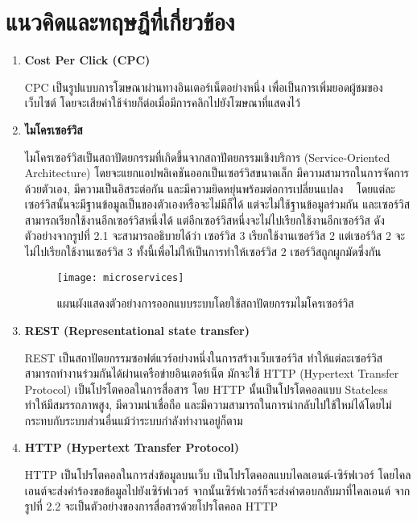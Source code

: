 \section{แนวคิดและทฤษฎีที่เกี่ยวข้อง}
\begin{enumerate}
	\item \textbf{Cost Per Click (CPC)}
	
	CPC เป็นรูปแบบการโฆษณาผ่านทางอินเตอร์เน็ตอย่างหนึ่ง เพื่อเป็นการเพิ่มยอดผู้ชมของเว็บไซต์  โดยจะเสียค่าใช้จ่ายก็ต่อเมื่อมีการคลิกไปยังโฆษณาที่แสดงไว้ ~\cite{cpc}
	
	\item \textbf{ไมโครเซอร์วิส}
	
	ไมโครเซอร์วิสเป็นสถาปัตยกรรมที่เกิดขึ้นจากสถาปัตยกรรมเชิงบริการ (Service-Oriented Architecture) โดยจะแยกแอปพลิเคชันออกเป็นเซอร์วิสขนาดเล็ก มีความสามารถในการจัดการด้วยตัวเอง, มีความเป็นอิสระต่อกัน และมีความยิดหยุ่นพร้อมต่อการเปลี่ยนแปลง ~\cite{microservices} โดยแต่ละเซอร์วิสนั้นจะมีฐานข้อมูลเป็นของตัวเองหรือจะไม่มีก็ได้ แต่จะไม่ใช้ฐานข้อมูลร่วมกัน และเซอร์วิสสามารถเรียกใช้งานอีกเซอร์วิสหนึ่งได้ แต่อีกเซอร์วิสหนึ่งจะไม่ไปเรียกใช้งานอีกเซอร์วิส ดังตัวอย่างจากรูปที่ 2.1 จะสามารถอธิบายได้ว่า เซอร์วิส 3 เรียกใช้งานเซอร์วิส 2 แต่เซอร์วิส 2 จะไม่ไปเรียกใช้งานเซอร์วิส 3 ทั้งนี้เพื่อไม่ให้เป็นการทำให้เซอร์วิส 2 เซอร์วิสถูกผูกมัดซึ่งกัน
	\begin{figure}[!h]
		\centering
		\texttt{[image: microservices]}  
		\caption{แผนผังแสดงตัวอย่างการออกแบบระบบโดยใช้สถาปัตยกรรมไมโครเซอร์วิส}
		\label{Fig:microservices}
	\end{figure}

	\item \textbf{REST (Representational state transfer)}

	REST เป็นสถาปัตยกรรมซอฟต์แวร์อย่างหนึ่งในการสร้างเว็บเซอร์วิส ทำให้แต่ละเซอร์วิสสามารถทำงานร่วมกันได้ผ่านเครือข่ายอินเตอร์เน็ต มักจะใช้ HTTP (Hypertext Transfer Protocol) เป็นโปรโตคอลในการสื่อสาร โดย HTTP นั้นเป็นโปรโตคอลแบบ Stateless ทำให้มีสมรรถภาพสูง, มีความน่าเชื่อถือ และมีความสามารถในการนำกลับไปใช้ใหม่ได้โดยไม่กระทบกับระบบส่วนอื่นแม้ว่าระบบกำลังทำงานอยู่ก็ตาม ~\cite{rest}
	
	\item \textbf{HTTP (Hypertext Transfer Protocol)}
	
	HTTP เป็นโปรโตคอลในการส่งข้อมูลบนเว็บ เป็นโปรโตคอลแบบไคลเอนต์-เซิร์ฟเวอร์ โดยไคลเอนต์จะส่งคำร้องขอข้อมูลไปยังเซิร์ฟเวอร์ จากนั้นเซิร์ฟเวอร์ก็จะส่งคำตอบกลับมาที่ไคลเอนต์ จากรูปที่ 2.2 จะเป็นตัวอย่างของการสื่อสารด้วยโปรโตคอล HTTP ~\cite{http}


\end{enumerate}
